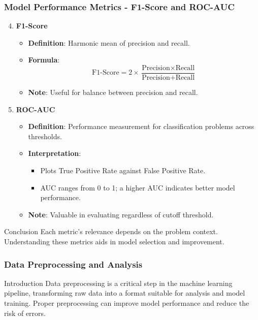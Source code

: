 \documentclass[aspectratio=169]{beamer}
\begin{document}
\begin{frame}[fragile]
    \frametitle{Model Performance Metrics - F1-Score and ROC-AUC}
    \begin{enumerate}
        \setcounter{enumi}{3} %

        \item \textbf{F1-Score}
            \begin{itemize}
                \item \textbf{Definition}: Harmonic mean of precision and recall.
                \item \textbf{Formula}:
                \begin{equation}
                \text{F1-Score} = 2 \times \frac{\text{Precision} \times \text{Recall}}{\text{Precision} + \text{Recall}}
                \end{equation}
                \item \textbf{Note}: Useful for balance between precision and recall.
            \end{itemize}

        \item \textbf{ROC-AUC}
            \begin{itemize}
                \item \textbf{Definition}: Performance measurement for classification problems across thresholds.
                \item \textbf{Interpretation}:
                    \begin{itemize}
                        \item Plots True Positive Rate against False Positive Rate.
                        \item AUC ranges from 0 to 1; a higher AUC indicates better model performance.
                    \end{itemize}
                \item \textbf{Note}: Valuable in evaluating regardless of cutoff threshold.
            \end{itemize}
    \end{enumerate}
    
    \begin{block}{Conclusion}
        Each metric's relevance depends on the problem context. Understanding these metrics aids in model selection and improvement.
    \end{block}
\end{frame}

\begin{frame}
    \frametitle{Data Preprocessing and Analysis}
    \begin{block}{Introduction}
        Data preprocessing is a critical step in the machine learning pipeline, transforming raw data into a format suitable for analysis and model training. Proper preprocessing can improve model performance and reduce the risk of errors.
    \end{block}
\end{frame}
\end{document}
